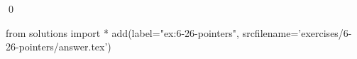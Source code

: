 
\begin{ex}
  \label{ex:6-26-pointers}
  
  \qed
\end{ex}
\begin{python0}
from solutions import *
add(label="ex:6-26-pointers",
    srcfilename='exercises/6-26-pointers/answer.tex')
\end{python0}
